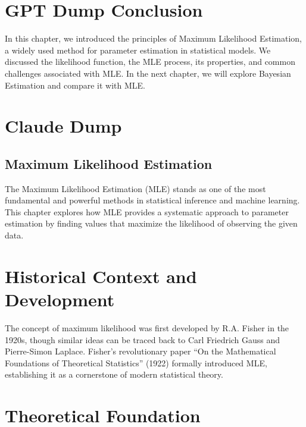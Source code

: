 \documentclass[
  12 pt,
  a4paper,
]{book}
\numberwithin{equation}{section}
\theoremstyle{plain}      %
\theoremstyle{definition} %
\theoremstyle{remark}     %
\theoremstyle{note}         %
\begin{document}
\hypertarget{gpt-dump-conclusion}{%
\section{GPT Dump Conclusion}\label{gpt-dump-conclusion}}

In this chapter, we introduced the principles of Maximum Likelihood
Estimation, a widely used method for parameter estimation in statistical
models. We discussed the likelihood function, the MLE process, its
properties, and common challenges associated with MLE. In the next
chapter, we will explore Bayesian Estimation and compare it with MLE.

\newpage

\hypertarget{claude-dump}{%
\section{Claude Dump}\label{claude-dump}}

\hypertarget{maximum-likelihood-estimation-1}{%
\subsection{Maximum Likelihood
Estimation}\label{maximum-likelihood-estimation-1}}

The Maximum Likelihood Estimation (MLE) stands as one of the most
fundamental and powerful methods in statistical inference and machine
learning. This chapter explores how MLE provides a systematic approach
to parameter estimation by finding values that maximize the likelihood
of observing the given data.

\hypertarget{historical-context-and-development}{%
\section{Historical Context and
Development}\label{historical-context-and-development}}

The concept of maximum likelihood was first developed by R.A. Fisher in
the 1920s, though similar ideas can be traced back to Carl Friedrich
Gauss and Pierre-Simon Laplace. Fisher's revolutionary paper ``On the
Mathematical Foundations of Theoretical Statistics'' (1922) formally
introduced MLE, establishing it as a cornerstone of modern statistical
theory.

\hypertarget{theoretical-foundation}{%
\section{Theoretical Foundation}\label{theoretical-foundation}}
\end{document}
